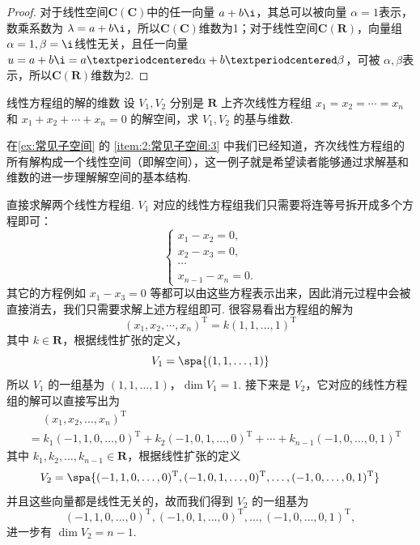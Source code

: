 \begin{proof}
    对于线性空间$\mathbf{C}(\mathbf{C})$中的任一向量 $a + b\i$，其总可以被向量 $\alpha = 1$表示，数乘系数为 $\lambda = a + b\i$，所以$\mathbf{C}(\mathbf{C})$维数为1；对于线性空间$\mathbf{C}(\mathbf{R})$，向量组 $\alpha = 1, \beta = \i$线性无关，且任一向量 $u = a + b\i = a·\alpha + b·\beta$，可被 $\alpha, \beta$表示，所以$\mathbf{C}(\mathbf{R})$维数为2.
\end{proof}

\begin{example}{}{线性方程组的解的维数}
    设 $V_1, V_2$ 分别是 $\mathbf{R}$ 上齐次线性方程组 $x_1 = x_2 = \cdots = x_n$ 和 $x_1 + x_2 + \cdots + x_n = 0$ 的解空间，求 $V_1, V_2$ 的基与维数.
\end{example}

在\autoref{ex:常见子空间} 的 \ref{item:2:常见子空间:3} 中我们已经知道，齐次线性方程组的所有解构成一个线性空间（即解空间），这一例子就是希望读者能够通过求解基和维数的进一步理解解空间的基本结构.

\begin{solution}
    直接求解两个线性方程组. $V_1$ 对应的线性方程组我们只需要将连等号拆开成多个方程即可：
    \[\begin{cases}
        x_1 - x_2 = 0, \\
        x_2 - x_3 = 0, \\
        \cdots \\
        x_{n-1} - x_n = 0.
    \end{cases}\]
    其它的方程例如 $x_1 - x_3 = 0$ 等都可以由这些方程表示出来，因此消元过程中会被直接消去，我们只需要求解上述方程组即可. 很容易看出方程组的解为
    \[(x_1,x_2,\cdots,x_n)^\mathrm{T} = k(1,1,\ldots,1)^\mathrm{T}\]
    其中 $k\in\mathbf{R}$，根据线性扩张的定义，
    \[V_1 = \spa\{(1,1,\ldots,1)\}\]
    所以 $V_1$ 的一组基为 $(1,1,\ldots,1)$，$\dim V_1 = 1$. 接下来是 $V_2$，它对应的线性方程组的解可以直接写出为
    \begin{align*}
        &\quad\ (x_1,x_2,\ldots,x_n)^\mathrm{T} \\
        &= k_1(-1,1,0,\ldots,0)^\mathrm{T} + k_2(-1,0,1,\ldots,0)^\mathrm{T} + \cdots + k_{n-1}(-1,0,\ldots,0,1)^\mathrm{T}
    \end{align*}
    其中 $k_1,k_2,\ldots,k_{n-1}\in\mathbf{R}$，根据线性扩张的定义
    \[V_2 = \spa\{(-1,1,0,\ldots,0)^\mathrm{T},(-1,0,1,\ldots,0)^\mathrm{T},\ldots,(-1,0,\ldots,0,1)^\mathrm{T}\}\]
    并且这些向量都是线性无关的，故而我们得到 $V_2$ 的一组基为
    \[(-1,1,0,\ldots,0)^\mathrm{T},(-1,0,1,\ldots,0)^\mathrm{T},\ldots,(-1,0,\ldots,0,1)^\mathrm{T},\]
    进一步有 $\dim V_2 = n - 1$.
\end{solution}

